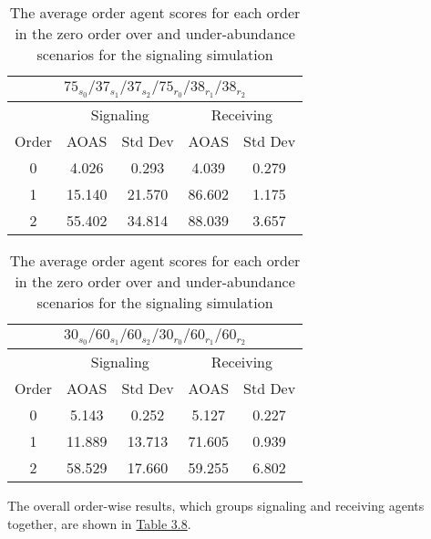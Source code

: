 \begin{table}[h]
    \centering
    \begin{tabular}{|c|c|c|c|c|}
    \hline
    \multicolumn{5}{|c|}{$75_{s_{0}}/37_{s_{1}}/37_{s_{2}}/75_{r_{0}}/38_{r_{1}}/38_{r_{2}}$} \\
    \hline
    \multicolumn{1}{|c|}{} & \multicolumn{2}{|c|}{Signaling} & \multicolumn{2}{|c|}{Receiving} \\
    \hline
    Order & AOAS & Std Dev & AOAS & Std Dev \\
    \hline
    0     & 4.026   & 0.293    & 4.039   & 0.279   \\
    1     & 15.140  & 21.570   & 86.602  & 1.175   \\
    2     & 55.402  & 34.814   & 88.039  & 3.657   \\
    \hline
    \end{tabular}
    \qquad
    \begin{tabular}{|c|c|c|c|c|}
        \hline
        \multicolumn{5}{|c|}{$30_{s_{0}}/60_{s_{1}}/60_{s_{2}}/30_{r_{0}}/60_{r_{1}}/60_{r_{2}}$} \\
        \hline
        \multicolumn{1}{|c|}{} & \multicolumn{2}{|c|}{Signaling} & \multicolumn{2}{|c|}{Receiving} \\
        \hline
        Order & AOAS & Std Dev & AOAS & Std Dev \\
        \hline
        0     & 5.143   & 0.252    & 5.127   & 0.227   \\
        1     & 11.889  & 13.713   & 71.605  & 0.939   \\
        2     & 58.529  & 17.660   & 59.255  & 6.802   \\
        \hline
        \end{tabular}
    \caption{The average order agent scores for each order in the zero order over and under-abundance scenarios for the signaling simulation}
    \label{table:sig-zero-order-simple}
\end{table}

The overall order-wise results, which groups signaling and receiving agents together, are shown in \hyperref[table:sig-zero-order-overall]{Table 3.8}.

